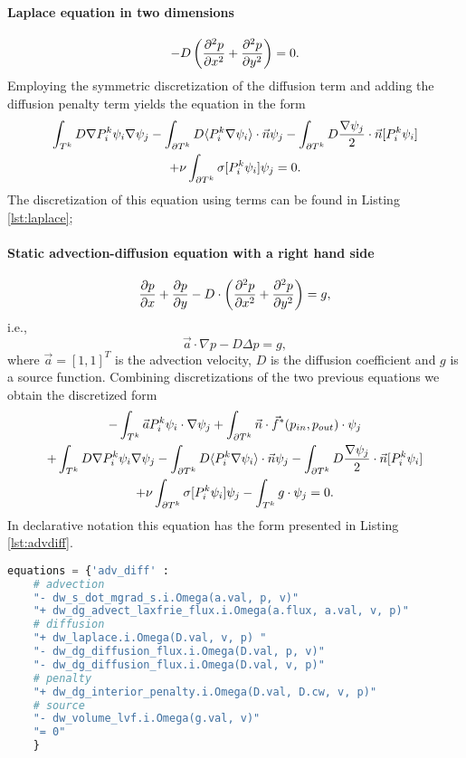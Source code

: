 \paragraph{Laplace equation in two dimensions}
\begin{equation}
    \label{eq:ex_laplace}
    - D \left(\frac{\partial^2 p}{\partial x^2} + \frac{\partial^2 p}{\partial y^2} \right)= 0.
\end{equation}
Employing the symmetric discretization of the diffusion term and adding the diffusion
penalty term yields the equation in the form
\begin{multline}
    \int_{T^k} D\nabla P^k_i\psi_i \nabla \psi_j
    - \int_{\partial T^k} D \langle P^k_i\nabla\psi_i\rangle \cdot \vec{n}\psi_j
    - \int_{\partial T^k} D \frac{\nabla \psi_j}{2}\cdot \vec{n} [P^k_i\psi_i] \\
    + \nu \int_{\partial T^k} \sigma [P^k_i\psi_i]\psi_j
    = 0.
\end{multline}
The discretization of this equation using \sfepy{} terms can be found in Listing
\ref{lst:laplace};
\paragraph{Static advection-diffusion equation with a right hand side}
\begin{equation}
\label{eq:ex_advdiff}
\frac{\partial p}{\partial x} + \frac{\partial p}{\partial y} - D \cdot \left( \frac{\partial^2 p}{\partial x^2} + \frac{\partial^2
p}{\partial y^2} \right) = g,
\end{equation}
i.e.,
\begin{equation}
\vec{a} \cdot \nabla p - D \Delta p = g,
\end{equation}
where $\vec{a} = [1, 1]^T$ is the advection velocity, $D$ is the diffusion coefficient
and $g$ is a source function. Combining discretizations of the two previous
equations we obtain the discretized form
\begin{multline}
- \int_{T^k} \vec{a}P_i^k\psi_i\cdot\nabla\psi_j
+ \int_{\partial{T^k}} \vec{n}\cdot \vec{f}^{*} (p_{in}, p_{out})\cdot\psi_j\\
+ \int_{T^k} D\nabla P^k_i\psi_i \nabla \psi_j
- \int_{\partial T^k} D \langle P^k_i\nabla\psi_i\rangle \cdot \vec{n}\psi_j
- \int_{\partial T^k} D \frac{\nabla \psi_j}{2}\cdot \vec{n} [P^k_i\psi_i] \\
+ \nu \int_{\partial T^k} \sigma [P^k_i\psi_i]\psi_j
- \int_{T^k} g\cdot \psi_j
= 0.
\end{multline}
In \sfepy{} declarative notation this equation has the form presented in
Listing \ref{lst:advdiff}.
\setcounter{lstannotation}{0}
\begin{lstlisting}[language=Python, caption=Static advection-diffusion equation
\label{lst:advdiff}]
equations = {'adv_diff' :
    # advection
    "- dw_s_dot_mgrad_s.i.Omega(a.val, p, v)"
    "+ dw_dg_advect_laxfrie_flux.i.Omega(a.flux, a.val, v, p)"
    # diffusion
    "+ dw_laplace.i.Omega(D.val, v, p) "
    "- dw_dg_diffusion_flux.i.Omega(D.val, p, v)"
    "- dw_dg_diffusion_flux.i.Omega(D.val, v, p)"
    # penalty
    "+ dw_dg_interior_penalty.i.Omega(D.val, D.cw, v, p)"
    # source
    "- dw_volume_lvf.i.Omega(g.val, v)"
    "= 0"
    }
\end{lstlisting}
